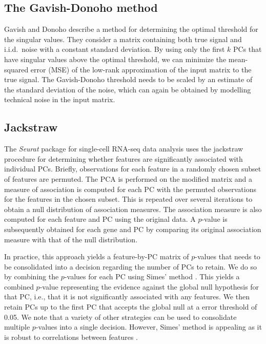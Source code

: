 \documentclass[10pt,letterpaper]{article}
\begin{document}
\subsection{The Gavish-Donoho method}
Gavish and Donoho \cite{gavish2014optimal} describe a method for determining the optimal threshold for the singular values.
They consider a matrix containing both true signal and i.i.d.\ noise with a constant standard deviation. 
By using only the first $k$ PCs that have singular values above the optimal threshold, 
we can minimize the mean-squared error (MSE) of the low-rank approximation of the input matrix to the true signal.
The Gavish-Donoho threshold needs to be scaled by an estimate of the standard deviation of the noise,
which can again be obtained by modelling technical noise in the input matrix.

\subsection{Jackstraw}
The \textit{Seurat} package for single-cell RNA-seq data analysis \cite{butler2018integrating} uses the jackstraw procedure \cite{chung2015statistical} for determining whether features are significantly associated with individual PCs.
Briefly, observations for each feature in a randomly chosen subset of features are permuted.
The PCA is performed on the modified matrix and a measure of association is computed for each PC with the permuted observations for the features in the chosen subset.
This is repeated over several iterations to obtain a null distribution of association measures.
The association measure is also computed for each feature and PC using the original data.
A $p$-value is subsequently obtained for each gene and PC by comparing its original association measure with that of the null distribution.

In practice, this approach yields a feature-by-PC matrix of $p$-values that needs to be consolidated into a decision regarding the number of PCs to retain. 
We do so by combining the $p$-values for each PC using Simes' method \cite{simes1986improved}.
This yields a combined $p$-value representing the evidence against the global null hypothesis for that PC, 
i.e., that it is not significantly associated with any features.
We then retain PCs up to the first PC that accepts the global null at a error threshold of 0.05.
We note that a variety of other strategies can be used to consolidate multiple $p$-values into a single decision.
However, Simes' method is appealing as it is robust to correlations between features \cite{sarkar1997simes}.
\end{document}
